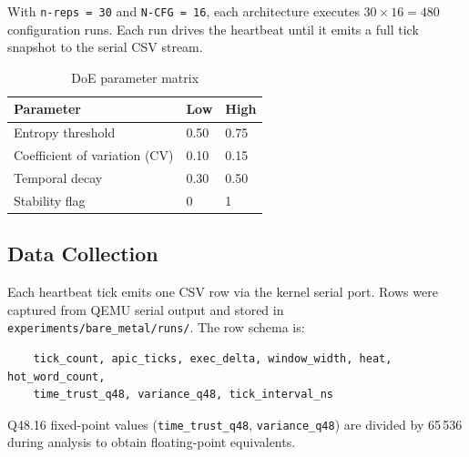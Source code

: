 \documentclass[10pt,a4paper]{article}
\begin{document}
With \texttt{n-reps = 30} and \texttt{N-CFG = 16}, each architecture executes
\(30 \times 16 = 480\) configuration runs.  Each run drives the heartbeat until
it emits a full tick snapshot to the serial CSV stream.

\begin{table}[h!]
\centering
\caption{DoE parameter matrix}
\label{tab:design}
\begin{tabular}{lll}
\toprule
Parameter & Low & High \\
\midrule
Entropy threshold  & 0.50 & 0.75 \\
Coefficient of variation (CV) & 0.10 & 0.15 \\
Temporal decay & 0.30 & 0.50 \\
Stability flag & 0 & 1 \\
\bottomrule
\end{tabular}
\end{table}

\subsection{Data Collection}

Each heartbeat tick emits one CSV row via the kernel serial port.  Rows were
captured from QEMU serial output and stored in
\texttt{experiments/bare\_metal/runs/}.  The row schema is:

\begin{verbatim}
    tick_count, apic_ticks, exec_delta, window_width, heat, hot_word_count,
    time_trust_q48, variance_q48, tick_interval_ns
\end{verbatim}

Q48.16 fixed-point values (\texttt{time\_trust\_q48}, \texttt{variance\_q48})
are divided by 65\,536 during analysis to obtain floating-point equivalents.
\end{document}
